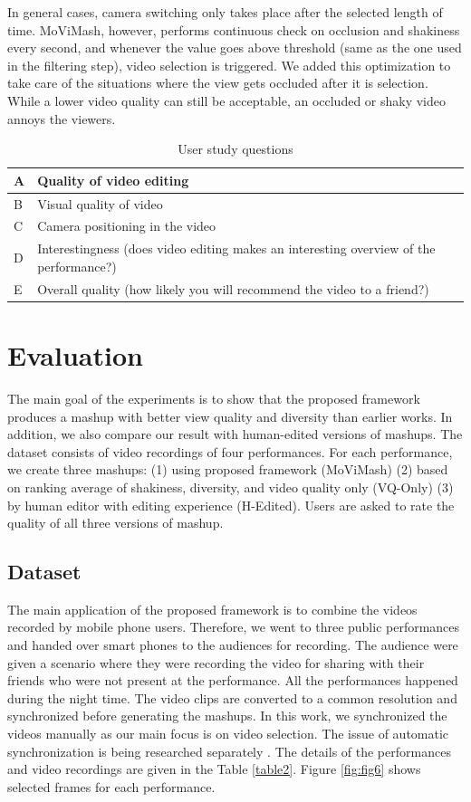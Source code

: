 \documentclass{sig-alternate}
\begin{document}
In general cases, camera switching only takes place after the selected length of time. MoViMash, however, performs continuous
check on occlusion and shakiness every second, and whenever the
value goes above threshold (same as the one used in the filtering
step), video selection is triggered. We added this optimization to
take care of the situations where the view gets occluded after it is selection. While a lower video quality can still be acceptable, an occluded or shaky video annoys the viewers.

\begin{table}
\small
\centering
\caption{User study questions}
\label{table3}
\begin{tabularx}{8cm}{p{0.15cm}|p{7.2cm}}
\hline
A & Quality of video editing\\
\hline
B & Visual quality of video\\
\hline
C & Camera positioning in the video\\
\hline
D & Interestingness (does video editing makes an interesting
overview of the performance?)\\
\hline
E & Overall quality (how likely you will recommend the video to
a friend?)\\
\hline
\end{tabularx}
\end{table}

\section{Evaluation}\label{eval}
The main goal of the experiments is to show that the proposed
framework produces a mashup with better view quality and diversity
than earlier works. In addition, we also compare our result with
human-edited versions of mashups. The dataset consists of video
recordings of four performances. For each performance, we create
three mashups: (1) using proposed framework (MoViMash) (2) based on ranking average of shakiness, diversity, and video quality only (VQ-Only) (3) by human editor with editing experience (H-Edited).
Users are asked to rate the quality of all three versions of mashup.

\subsection{Dataset}
The main application of the proposed framework is to combine
the videos recorded by mobile phone users. Therefore, we went to
three public performances and handed over smart phones to the audiences for recording. The audience were given a scenario where
they were recording the video for sharing with their friends who
were not present at the performance. All the performances happened
during the night time. The video clips are converted to a common resolution and synchronized before generating the mashups. In this work, we synchronized the videos manually as our main focus is on video selection. The issue of automatic synchronization is being researched separately \cite{14}. The details of the performances and video recordings are given in the Table \ref{table2}. Figure \ref{fig:fig6} shows selected frames for each performance.
\end{document}
